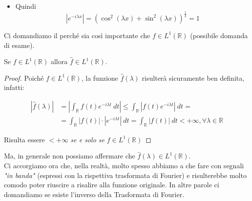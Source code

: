 \begin{itemize}
\begin{center}
\begin{tikzpicture}[x=1.0pt,y=1.0pt,yscale=-1,xscale=1]
              \end{tikzpicture}
          \end{center}
    \item Quindi
          $$
              |e^{-i \lambda x}| = (\cos^2 (\lambda x) + \sin^2(\lambda
              x))^{\frac{1}{2}} = 1
          $$

\end{itemize}

\vspace{1cm}

Ci domandiamo il perché sia così importante che $f \in L^1(\mathbb{R})$
(possibile domanda di esame).\\

\begin{center}
    Se $f \in L^1(\mathbb{R})$ allora $\hat{f} \in L^1(\mathbb{R})$.
\end{center}

\begin{proof}
    Poiché $f \in L^1(\mathbb{R})$, la funzione $\hat{f}(\lambda)$ risulterà
    sicuramente ben definita, infatti:

    \begin{equation}
        \begin{aligned}
            |\hat{f}(\lambda)| & = \left|\int_{\mathbb{R}} f(t) e^{-i \lambda t} \ dt \right| \leq \int_{\mathbb{R}} |f(t) e^{-i \lambda t}| \ dt =                  \\
                               & = \int_{\mathbb{R}} |f(t)| \cdot |e^{-i \lambda t}| \ dt = \int_{\mathbb{R}} |f(t)| \ dt < + \infty, \forall \lambda \in \mathbb{R}
        \end{aligned}
    \end{equation}

    Risulta essere $< +\infty$ \textit{se e solo se} $f\in L^1(\mathbb{R})$

\end{proof}

Ma, in generale non possiamo affermare che $\hat{f}(\lambda)
    \in L^1(\mathbb{R})$.\\


Ci accorgiamo ora che, nella realtà, molto spesso abbiamo a che fare con segnali
\textit{"in banda"} (espressi con la rispettiva trasformata di Fourier) e
risulterebbe molto comodo poter riuscire a risalire alla funzione originale. In
altre parole ci domandiamo se esiste l'inverso della Trasformata di Fourier.

